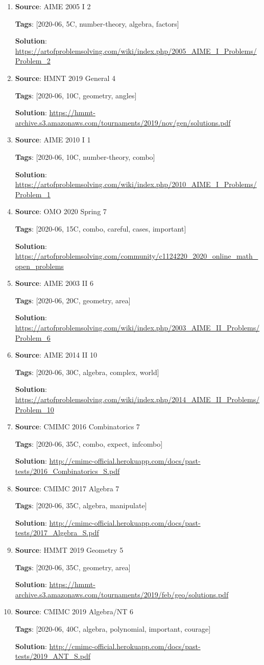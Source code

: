 \documentclass[11pt]{article}
\begin{document}
\begin{enumerate}
 \item \textbf{Source}: AIME 2005 I 2
 
 \textbf{Tags}: [2020-06, 5C, number-theory, algebra, factors]
 
 \textbf{Solution}: \url{https://artofproblemsolving.com/wiki/index.php/2005\_AIME\_I\_Problems/Problem\_2}
 \item \textbf{Source}: HMNT 2019 General 4
 
 \textbf{Tags}: [2020-06, 10C, geometry, angles]
 
 \textbf{Solution}: \url{https://hmmt-archive.s3.amazonaws.com/tournaments/2019/nov/gen/solutions.pdf}
 \item \textbf{Source}: AIME 2010 I 1
 
 \textbf{Tags}: [2020-06, 10C, number-theory, combo]
 
 \textbf{Solution}: \url{https://artofproblemsolving.com/wiki/index.php/2010\_AIME\_I\_Problems/Problem\_1}
 \item \textbf{Source}: OMO 2020 Spring 7
 
 \textbf{Tags}: [2020-06, 15C, combo, careful, cases, important]
 
 \textbf{Solution}: \url{https://artofproblemsolving.com/community/c1124220\_2020\_online\_math\_open\_problems}
 \item \textbf{Source}: AIME 2003 II 6
 
 \textbf{Tags}: [2020-06, 20C, geometry, area]
 
 \textbf{Solution}: \url{https://artofproblemsolving.com/wiki/index.php/2003\_AIME\_II\_Problems/Problem\_6}
 \item \textbf{Source}: AIME 2014 II 10
 
 \textbf{Tags}: [2020-06, 30C, algebra, complex, world]
 
 \textbf{Solution}: \url{https://artofproblemsolving.com/wiki/index.php/2014\_AIME\_II\_Problems/Problem\_10}
 \item \textbf{Source}: CMIMC 2016 Combinatorics 7
 
 \textbf{Tags}: [2020-06, 35C, combo, expect, infcombo]
 
 \textbf{Solution}: \url{http://cmimc-official.herokuapp.com/docs/past-tests/2016\_Combinatorics\_S.pdf}
 \item \textbf{Source}: CMIMC 2017 Algebra 7
 
 \textbf{Tags}: [2020-06, 35C, algebra, manipulate]
 
 \textbf{Solution}: \url{http://cmimc-official.herokuapp.com/docs/past-tests/2017\_Algebra\_S.pdf}
 \item \textbf{Source}: HMMT 2019 Geometry 5
 
 \textbf{Tags}: [2020-06, 35C, geometry, area]
 
 \textbf{Solution}: \url{https://hmmt-archive.s3.amazonaws.com/tournaments/2019/feb/geo/solutions.pdf}
 \item \textbf{Source}: CMIMC 2019 Algebra/NT 6
 
 \textbf{Tags}: [2020-06, 40C, algebra, polynomial, important, courage]
 
 \textbf{Solution}: \url{http://cmimc-official.herokuapp.com/docs/past-tests/2019\_ANT\_S.pdf}\end{enumerate}
\end{document}
